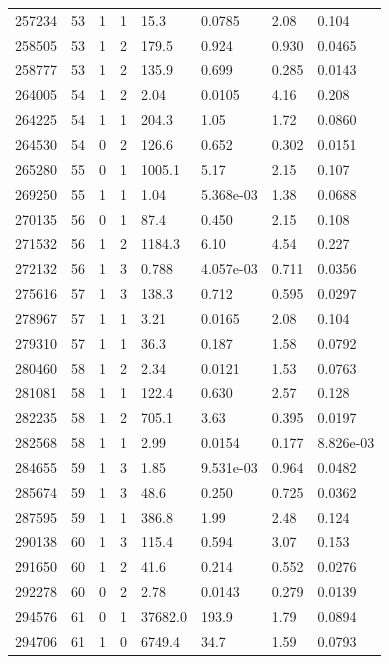 \documentclass[preview]{standalone}
\begin{document}
{{{{{\begin{tabular}{L{1.2cm}C{1.2cm} C{0.3cm}C{0.5cm} C{1.4cm}C{1.4cm} C{1.4cm}C{1.4cm}}
  257234  &    53  & 1     &  1 &  15.3  & 0.0785  & 2.08 &  0.104   \\ 
  258505  &    53  & 1     &  2 &  179.5  & 0.924  & 0.930 &  0.0465   \\ 
  258777  &    53  & 1     &  2 &  135.9  & 0.699  & 0.285 &  0.0143   \\ 
  264005  &    54  & 1     &  2 &  2.04  & 0.0105  & 4.16 &  0.208   \\ 
  264225  &    54  & 1     &  1 &  204.3  & 1.05  & 1.72 &  0.0860   \\ 
  264530  &    54  & 0     &  2 &  126.6  & 0.652  & 0.302 &  0.0151   \\ 
  265280  &    55  & 0     &  1 &  1005.1  & 5.17  & 2.15 &  0.107   \\ 
  269250  &    55  & 1     &  1 &  1.04  & 5.368e-03  & 1.38 &  0.0688   \\ 
  270135  &    56  & 0     &  1 &  87.4  & 0.450  & 2.15 &  0.108   \\ 
  271532  &    56  & 1     &  2 &  1184.3  & 6.10  & 4.54 &  0.227   \\ 
  272132  &    56  & 1     &  3 &  0.788  & 4.057e-03  & 0.711 &  0.0356   \\ 
  275616  &    57  & 1     &  3 &  138.3  & 0.712  & 0.595 &  0.0297   \\ 
  278967  &    57  & 1     &  1 &  3.21  & 0.0165  & 2.08 &  0.104   \\ 
  279310  &    57  & 1     &  1 &  36.3  & 0.187  & 1.58 &  0.0792   \\ 
  280460  &    58  & 1     &  2 &  2.34  & 0.0121  & 1.53 &  0.0763   \\ 
  281081  &    58  & 1     &  1 &  122.4  & 0.630  & 2.57 &  0.128   \\ 
  282235  &    58  & 1     &  2 &  705.1  & 3.63  & 0.395 &  0.0197   \\ 
  282568  &    58  & 1     &  1 &  2.99  & 0.0154  & 0.177 &  8.826e-03   \\ 
  284655  &    59  & 1     &  3 &  1.85  & 9.531e-03  & 0.964 &  0.0482   \\ 
  285674  &    59  & 1     &  3 &  48.6  & 0.250  & 0.725 &  0.0362   \\ 
  287595  &    59  & 1     &  1 &  386.8  & 1.99  & 2.48 &  0.124   \\ 
  290138  &    60  & 1     &  3 &  115.4  & 0.594  & 3.07 &  0.153   \\ 
  291650  &    60  & 1     &  2 &  41.6  & 0.214  & 0.552 &  0.0276   \\ 
  292278  &    60  & 0     &  2 &  2.78  & 0.0143  & 0.279 &  0.0139   \\ 
  294576  &    61  & 0     &  1 &  37682.0  & 193.9  & 1.79 &  0.0894   \\ 
  294706  &    61  & 1     &  0 &  6749.4  & 34.7  & 1.59 &  0.0793   \\ 
\hline 
\end{tabular} 

}}}}}
\end{document}
